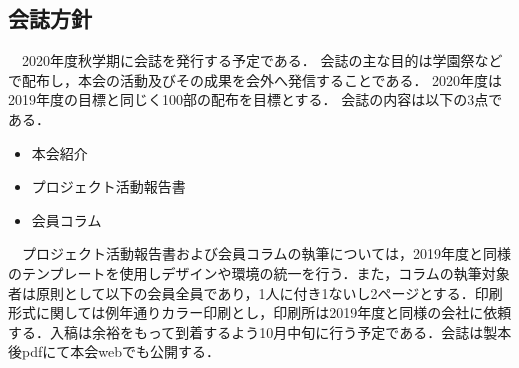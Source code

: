 \subsection*{会誌方針}
　2020年度秋学期に会誌を発行する予定である．
会誌の主な目的は学園祭などで配布し，本会の活動及びその成果を会外へ発信することである．
2020年度は2019年度の目標と同じく100部の配布を目標とする．
会誌の内容は以下の3点である．
\begin{itemize}
\item 本会紹介
\item プロジェクト活動報告書
\item 会員コラム
\end{itemize}
　プロジェクト活動報告書および会員コラムの執筆については，2019年度と同様のテンプレートを使用しデザインや環境の統一を行う．また，コラムの執筆対象者は原則として\thirdGrade{}以下の会員全員であり，1人に付き1ないし2ページとする．印刷形式に関しては例年通りカラー印刷とし，印刷所は2019年度と同様の会社に依頼する．入稿は余裕をもって到着するよう10月中旬に行う予定である．会誌は製本後pdfにて本会webでも公開する．

